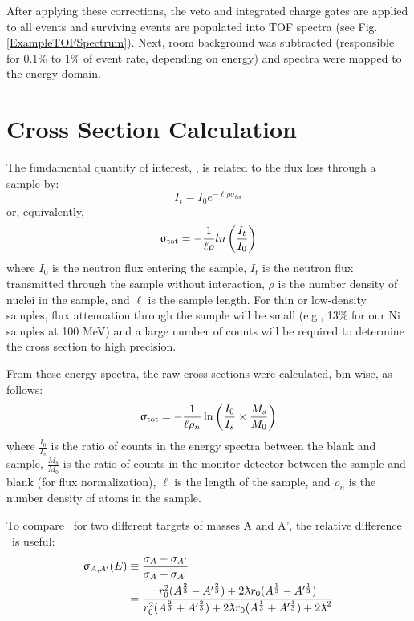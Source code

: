 After applying these corrections, the veto and integrated charge gates are applied to 
all events and surviving events are populated into TOF spectra (see Fig.
\ref{ExampleTOFSpectrum}). Next, room background was subtracted (responsible for 0.1\% to 
1\% of event rate, depending on energy) and spectra were mapped to the energy domain.

\section{Cross Section Calculation}
The fundamental quantity of interest, \tot, is related to the flux
loss through a sample by:
\begin{equation}
I_{t} = I_{0}e^{-{\ell\rho\sigma_{tot}}}
\end{equation}
or, equivalently,
\begin{equation}
    \upsigma_{\text{tot}} = -\frac{1}{\ell\rho}ln\left(\frac{I_{t}}{I_{0}}\right)
\end{equation}
where $I_{0}$ is the neutron flux entering the sample, $I_{t}$ is the neutron
flux transmitted through the sample without interaction, $\rho$ is the number
density of nuclei in the sample, and $\ell$ is the sample length. For thin
or low-density samples, flux attenuation through the sample will be small
(e.g., 13\% for our Ni samples at 100 MeV) and a large number
of counts will be required to determine the cross section to high
precision.

From these energy spectra, the raw cross sections were calculated, bin-wise, as follows:
$$
\upsigma_{\text{tot}} = -\frac{1}{\ell\rho_{n}}
\ln \left(\frac{I_{0}}{I_{s}}\times\frac{M_{s}}{M_{0}}\right)
$$
where $\frac{I_{0}}{I_{s}}$ is the ratio of counts in the energy spectra between 
the blank and sample, $\frac{M_{s}}{M_{0}}$ is the ratio of counts in the
monitor detector between the sample and blank (for flux normalization), $\ell$ is the length 
of the sample, and $\rho_{n}$ is the number density of atoms in the sample.

To compare \tot\ for two different targets of masses A and A', the relative
difference \totRD\ is useful:
\begin{equation} \label{SASRelDiff}
    \begin{split}
        \totRD & \equiv
    \frac{\sigma_{A}-\sigma_{A'}}{\sigma_{A}+\sigma_{A'}} \\
    & =
    \frac{r_{0}^{2}(A^{\frac{2}{3}}-A'^{\frac{2}{3}}) +
    2\lambdabar r_{0}(A^{\frac{1}{3}}-A'^{\frac{1}{3}})}
    {r_{0}^{2}(A^{\frac{2}{3}}+A'^{\frac{2}{3}}) +
    2\lambdabar r_{0}(A^{\frac{1}{3}}+A'^{\frac{1}{3}}) + 2\lambdabar^{2}}
    \end{split}
\end{equation}

